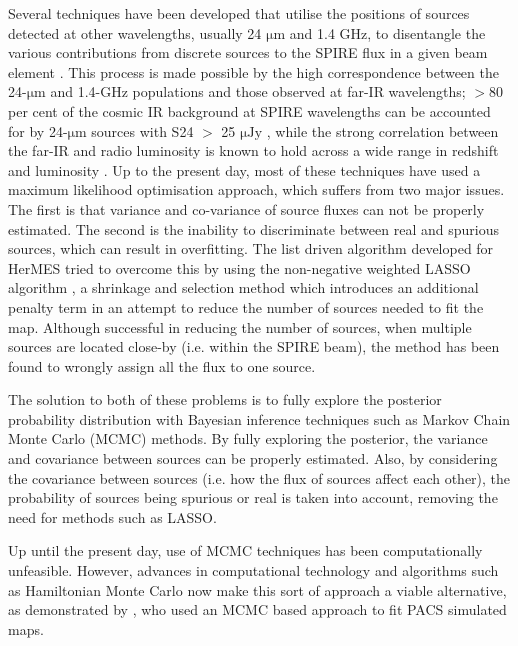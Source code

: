 \documentclass[useAMS,usenatbib]{mnras}
\begin{document}
Several techniques have been developed that utilise the positions of sources detected at other wavelengths, usually 24 $\mathrm{\mu m}$ and 1.4 GHz, to disentangle the various contributions from discrete sources to the SPIRE flux in a given beam element \citep[e.g.][]{Roseboom:2010, Roseboom:2011, Chapin:2011}. This process is made possible by the high correspondence between the 24-$\mathrm{\mu m}$ and 1.4-GHz populations and those observed at far-IR wavelengths; $>$80 per cent of the cosmic IR background at SPIRE wavelengths can be accounted for by 24-$\mathrm{\mu m}$ sources with S24 $>$ 25 $\mathrm{\mu Jy}$ \citep[e.g.][]{Marsden:2009, Pascale:2009, Elbaz:2010, Bethermin:2012}, while the strong correlation between the far-IR and radio luminosity is known to hold across a wide range in redshift and luminosity \citep[e.g.][]{Ivison:2010}. Up to the present day, most of these techniques have used a maximum likelihood optimisation approach, which suffers from two major issues. The first is that variance and co-variance of source fluxes can not be properly estimated. The second is the inability to discriminate between real and spurious sources, which can result in overfitting. The list driven algorithm developed for HerMES \citep[DESPHOT][]{Roseboom:2011,Wang:2014} tried to overcome this by using the non-negative weighted LASSO algorithm \citep{Tibshirani:1996, Zou:2006, terBraak:2010}, a shrinkage and selection method which introduces an additional penalty term in an attempt to reduce the number of sources needed to fit the map. Although successful in reducing the number of sources, when multiple sources are located close-by (i.e. within the SPIRE beam), the method has been found to wrongly assign all the flux to one source. 

The solution to both of these problems is to fully explore the posterior probability distribution with Bayesian inference techniques such as Markov Chain Monte Carlo (MCMC) methods. By fully exploring the posterior, the variance and covariance between sources can be properly estimated. Also, by considering the covariance between sources (i.e. how the flux of sources affect each other), the probability of sources being spurious or real is taken into account, removing the need for methods such as LASSO. 

Up until the present day, use of MCMC techniques has been computationally unfeasible. However, advances in computational technology and algorithms such as Hamiltonian Monte Carlo now make this sort of approach a viable alternative, as demonstrated by \cite{Safarzadeh:2015}, who used an MCMC based approach to fit PACS simulated maps.
 
\end{document}
